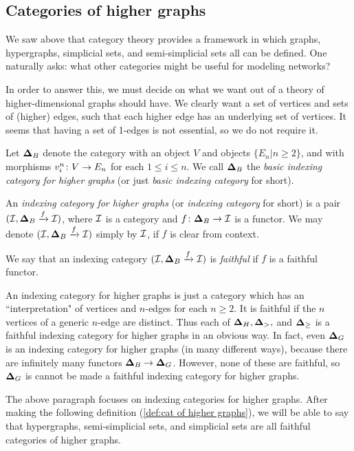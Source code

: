 \documentclass{amsart}
\def\bD{{\bf \Delta}}
\begin{document}
\subsection{Categories of higher graphs}\label{subsec:cats of higher graphs}

We saw above that category theory provides a framework in which graphs, hypergraphs, simplicial sets, and semi-simplicial sets all can be defined.  One naturally asks: what other categories might be useful for modeling networks?

In order to answer this, we must decide on what we want out of a theory of higher-dimensional graphs should have.  We clearly want a set of vertices and sets of (higher) edges, such that each higher edge has an underlying set of vertices.  It seems that having a set of 1-edges is not essential, so we do not require it.  

\begin{definition}\label{def:indexing cats}

Let $\bD_B$ denote the category with an object $V$ and objects $\{E_n|n\geq 2\}$, and with morphisms $v^n_i\colon V\rightarrow E_n$ for each $1\leq i\leq n$.  We call $\bD_B$ the {\em basic indexing category for higher graphs} (or just {\em basic indexing category} for short). 

An {\em indexing category for higher graphs} (or {\em indexing category} for short) is a pair $(\mcI,\bD_B\To{f}\mcI)$, where $\mathcal{I}$ is a category and $f\taking\bD_B\to\mcI$ is a functor.  We may denote $(\mcI,\bD_B\To{f}\mcI)$ simply by $\mathcal{I}$, if $f$ is clear from context.

We say that an indexing category $(\mcI,\bD_B\To{f}\mcI)$ is {\em faithful} if $f$ is a faithful functor.

\end{definition}

\begin{remark}\label{rem:three models}

An indexing category for higher graphs is just a category which has an ``interpretation" of vertices and $n$-edges for each $n\geq 2$.  It is faithful if the $n$ vertices of a generic $n$-edge are distinct.  Thus each of $\bD_H, \bD_>,$ and $\bD_\geq$ is a faithful indexing category for higher graphs in an obvious way.  In fact, even $\bD_G$ is an indexing category for higher graphs (in many different ways), because there are infinitely many functors $\bD_B\to\bD_G$.  However, none of these are faithful, so $\bD_G$ is cannot be made a faithful indexing category for higher graphs.

The above paragraph focuses on indexing categories for higher graphs.  After making the following definition (\ref{def:cat of higher graphs}), we will be able to say that hypergraphs, semi-simplicial sets, and simplicial sets are all faithful categories of higher graphs.

\end{remark}
\end{document}
